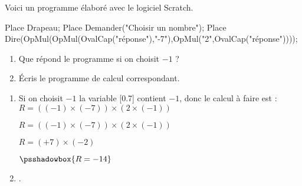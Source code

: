 \begin{exercice*}
    Voici un programme élaboré avec le logiciel Scratch.
    \begin{Scratch}[Echelle=0.75]
        Place Drapeau;
        Place Demander("Choisir un nombre");
        Place Dire(OpMul(OpMul(OvalCap("réponse"),"-7"),OpMul("2",OvalCap("réponse"))));
    \end{Scratch}
        \begin{enumerate}
            \item Que répond le programme si on choisit $-1$ ?
            \item Écris le programme de calcul correspondant.
        \end{enumerate}
\end{exercice*}
\begin{corrige}
    \phantom{rrr}    
        \begin{enumerate}
            \item Si on choisit $-1$ la variable
            \raisebox{-0.3\totalheight}[0.7\totalheight]{\raisebox{\depth}{
            \begin{Scratch}[Echelle=0.75]
                Place OvalCap("réponse");
            \end{Scratch}
            }}
            contient $-1$, donc le calcul à faire est : $ R = \left( (-1)\times (-7) \right)\times\left(2\times (-1)\right) $

            $ R = \left( (-1)\times (-7) \right)\times\left(2\times (-1)\right) $
            
            $ R = \left( +7 \right)\times\left(-2 \right) $

            $ \psshadowbox{R = -14} $
            \item .
        \end{enumerate}
\end{corrige}